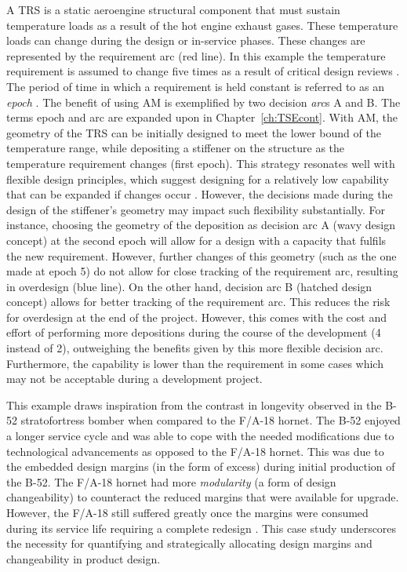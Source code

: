 A \ac{TRS} is a static aeroengine structural component that must sustain temperature loads as a result of the hot engine exhaust gases. These temperature loads can change during the design or in-service phases. These changes are represented by the requirement arc (red line). In this example the temperature requirement is assumed to change five times as a result of critical design reviews \cite{Cooper2008}. The period of time in which a requirement is held constant is referred to as an \textit{epoch} \cite{McManus2007}. The benefit of using \ac{AM} is exemplified by two decision \textit{arc}s A and B. The terms epoch and arc are expanded upon in Chapter~\ref{ch:TSEcont}. With \ac{AM}, the geometry of the \ac{TRS} can be initially designed to meet the lower bound of the temperature range, while depositing a stiffener on the structure as the temperature requirement changes (first epoch). This strategy resonates well with flexible design principles, which suggest designing for a relatively low capability that can be expanded if changes occur \cite{DeNeufville2011}. However, the decisions made during the design of the stiffener's geometry may impact such flexibility substantially. For instance, choosing the geometry of the deposition as decision arc A (wavy design concept) at the second epoch will allow for a design with a capacity that fulfils the new requirement. However, further changes of this geometry (such as the one made at epoch 5) do not allow for close tracking of the requirement arc, resulting in overdesign (blue line). On the other hand, decision arc B (hatched design concept) allows for better tracking of the requirement arc. This reduces the risk for overdesign at the end of the project. However, this comes with the cost and effort of performing more depositions during the course of the development (4 instead of 2), outweighing the benefits given by this more flexible decision arc. Furthermore, the capability is lower than the requirement in some cases which may not be acceptable during a development project.

This example draws inspiration from the contrast in longevity observed in the B-52 stratofortress bomber when compared to the F/A-18 hornet. The B-52 enjoyed a longer service cycle and was able to cope with the needed modifications due to technological advancements as opposed to the F/A-18 hornet. This was due to the embedded design margins (in the form of excess) during initial production of the B-52. The F/A-18 hornet had more \textit{modularity} (a form of design changeability) to counteract the reduced margins that were available for upgrade. However, the F/A-18 still suffered greatly once the margins were consumed during its service life requiring a complete redesign \cite{Long2017}. This case study underscores the necessity for quantifying and strategically allocating design margins and changeability in product design.


